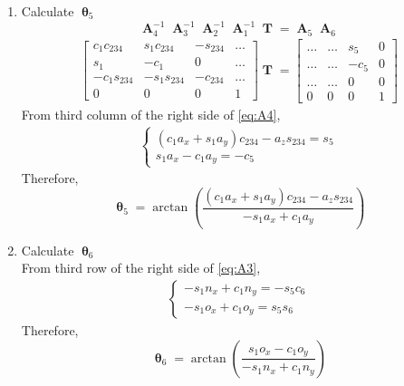 \documentclass[12pt]{article}
\DeclareMathOperator{\A}{\mathbf{A}}
\DeclareMathOperator{\T}{\mathbf{T}}
\DeclareMathOperator{\Th}{\mathbf{\theta}}
\begin{document}
\begin{enumerate}
  \item Calculate $\Th_5$\\
    $$\A_4^{-1}\A_3^{-1}\A_2^{-1}\A_1^{-1}\T = \A_5\A_6$$
    \begin{align} \label{eq:A4}
      \begin{bmatrix}
        c_1c_{234} & s_1c_{234} & -s_{234} & \dots\\
        s_1 & -c_1 & 0 & \dots\\
        -c_1s_{234} & -s_1s_{234} & -c_{234} & \dots\\
        0 & 0 & 0 & 1
      \end{bmatrix}\T = 
      \begin{bmatrix}
        \dots & \dots & s_5 & 0\\
        \dots & \dots & -c_5 & 0\\
        \dots & \dots & 0 & 0\\
        0 & 0 & 0 & 1
      \end{bmatrix}
    \end{align}
    From third column of the right side of \ref{eq:A4},
    \begin{align*}
      \begin{cases}
        (c_1a_x + s_1a_y)c_{234} - a_zs_{234} = s_5\\
        s_1a_x - c_1a_y = -c_5
      \end{cases}
    \end{align*}
    Therefore,
    $$\Th_5 = \arctan\left(\frac{(c_1a_x + s_1a_y)c_{234} - a_zs_{234}}{-s_1a_x + c_1a_y}\right)$$

  \item Calculate $\Th_6$\\
    From third row of the right side of \ref{eq:A3},
    \begin{align*}
      \begin{cases}
        -s_1n_x + c_1n_y = -s_5c_6\\
        -s_1o_x + c_1o_y = s_5s_6
      \end{cases}
    \end{align*}
    Therefore,
    $$\Th_6 = \arctan(\frac{s_1o_x - c_1o_y}{-s_1n_x + c_1n_y})$$

\end{enumerate}
\end{document}
